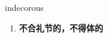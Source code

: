 
\begin{frame}
{\huge indecorous}
\begin{center}
\begin{enumerate}\Large
  \item \textbf{不合礼节的，不得体的}
\end{enumerate}
\end{center}
\end{frame}
